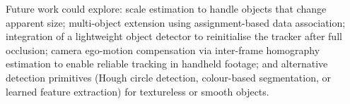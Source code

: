 \documentclass[12pt,a4paper]{article}
\begin{document}
Future work could explore: scale estimation to handle objects that change apparent size;
multi-object extension using assignment-based data association; integration of a lightweight
object detector to reinitialise the tracker after full occlusion; camera ego-motion compensation
via inter-frame homography estimation to enable reliable tracking in handheld footage; and
alternative detection primitives (Hough circle detection, colour-based segmentation, or
learned feature extraction) for textureless or smooth objects.

\newpage
\printbibliography[heading=bibintoc, title={References}]
\end{document}
